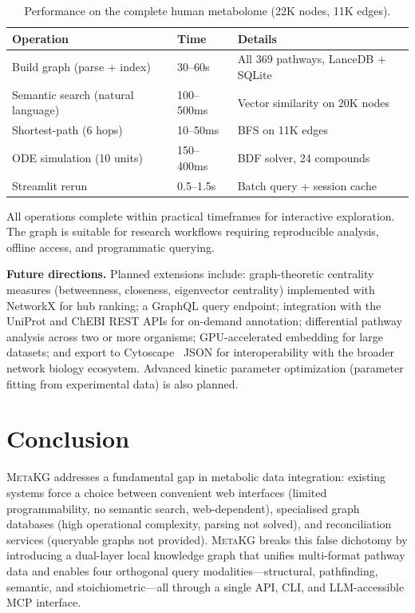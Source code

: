 \documentclass[10pt]{article}
\begin{document}
\begin{table}[H]
  \centering
  \caption{Performance on the complete human metabolome (22K nodes, 11K edges).}
  \label{tab:performance}
  \small
  \begin{tabular}{@{}lll@{}}
    \toprule
    Operation & Time & Details \\
    \midrule
    Build graph (parse + index) & 30--60s & All 369 pathways, LanceDB + SQLite \\
    Semantic search (natural language) & 100--500ms & Vector similarity on 20K nodes \\
    Shortest-path (6 hops) & 10--50ms & BFS on 11K edges \\
    ODE simulation (10 units) & 150--400ms & BDF solver, 24 compounds \\
    Streamlit rerun & 0.5--1.5s & Batch query + session cache \\
    \bottomrule
  \end{tabular}
\end{table}

All operations complete within practical timeframes for interactive exploration.
The graph is suitable for research workflows requiring reproducible analysis,
offline access, and programmatic querying.

\textbf{Future directions.} Planned extensions include: graph-theoretic centrality
measures (betweenness, closeness, eigenvector centrality) implemented with
NetworkX for hub ranking; a GraphQL query endpoint; integration with the
UniProt and ChEBI REST APIs for on-demand annotation; differential pathway
analysis across two or more organisms; GPU-accelerated embedding for large
datasets; and export to Cytoscape~\citep{shannon2003cytoscape} JSON for
interoperability with the broader network biology ecosystem. Advanced kinetic
parameter optimization (parameter fitting from experimental data) is also
planned.

\section{Conclusion}
\label{sec:conclusion}

\textsc{MetaKG} addresses a fundamental gap in metabolic data integration:
existing systems force a choice between convenient web interfaces (limited
programmability, no semantic search, web-dependent), specialised graph databases
(high operational complexity, parsing not solved), and reconciliation services
(queryable graphs not provided). \textsc{MetaKG} breaks this false dichotomy by
introducing a dual-layer local knowledge graph that unifies multi-format pathway
data and enables four orthogonal query modalities---structural, pathfinding,
semantic, and stoichiometric---all through a single API, CLI, and LLM-accessible
MCP interface.
\end{document}

